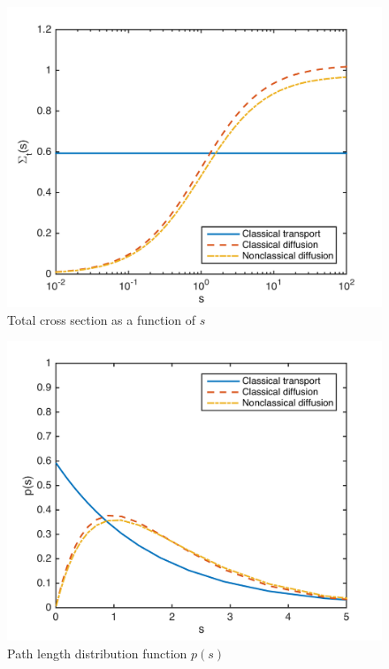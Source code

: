 \documentclass[preprint,12pt]{elsarticle}
\begin{document}
\begin{figure}
    \centering
        \includegraphics[scale=0.3]{fig1}
        \caption{Total cross section as a function of $s$}
        \label{fig1}
\end{figure}
\begin{figure}
    \centering
        \includegraphics[scale=0.3]{fig2}
        \caption{Path length distribution function $p(s)$}
        \label{fig2}
\end{figure}



\pagebreak
\end{document}
